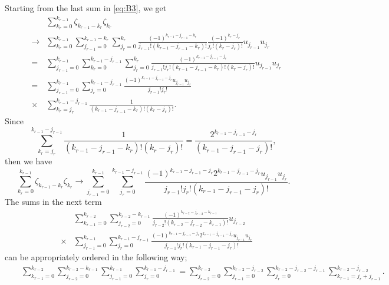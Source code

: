 \documentclass[10pt]{amsart}
\numberwithin{equation}{section}
\theoremstyle{definition}
\begin{document}
Starting from the last sum in  \eqref{eq:B3}, we get
\begin{eqnarray}
&&\sum _{k_{r}=0}^{k_{r-1}}\zeta _{k_{r-1}-k_{r}}\zeta _{k_{r}}
\label{eqC.5}
\\
&\to & \sum _{k_{r}=0}^{k_{r-1}}\sum _{j_{r-1}=0}^{k_{r-1}-k_{r}}
\sum _{j_{r}=0}^{k_{r}}
\frac{(-1)^{k_{r-1}-j_{r-1}-k_{r}}}{j_{r-1}!(k_{r-1}-j_{r-1}-k_{r})!}
\frac{(-1)^{k_{r}-j_{r }}}{j_{r}!(k_{r}-j_{r})!}u_{j_{r-1}}u_{j_{r}}
\nonumber
\\
&=& \sum _{j_{r-1}=0}^{k_{r-1}}\sum _{k_{r}=0}^{k_{r-1}-j_{r-1}}\sum _{j_{r}=0}^{k_{r}}
\frac{(-1)^{k_{r-1}-j_{r-1}-j_{r} }}{j_{r-1}!j_{r}!(k_{r-1}-j_{r-1}-k_{r})!(k_{r}-j_{r})!}
u_{j_{r-1}}u_{j_{r}}
\nonumber
\\
&=& \sum _{j_{r-1}=0}^{k_{r-1}}\sum _{j_{r}=0}^{k_{r-1}-j_{r-1}}
\frac{(-1)^{k_{r-1}-j_{r-1}-j_{r} }u_{j_{r-1}}u_{j_{r}}}{j_{r-1}!j_{r}!}
\nonumber
\\
&\times &\sum _{k_{r}=j_{r}}^{k_{r-1}-j_{r-1}}
\frac{1}{(k_{r-1}-j_{r-1}-k_{r})!(k_{r}-j_{r})!}.
\nonumber
\end{eqnarray}
Since
\begin{equation}
\sum _{k_{r}=j_{r}}^{k_{r-1}-j_{r-1}}
\frac{1}{(k_{r-1}-j_{r-1}-k_{r})!(k_{r}-j_{r})!}=
\frac{2^{k_{r-1}- j_{r-1}-j_{r}}}{( k_{r-1}-j_{r-1}-j_{r})!},
\label{eqC.6}
\end{equation}
then we have
\begin{equation}
\label{term1}
\sum _{k_{r}=0}^{k_{r-1}}\zeta _{k_{r-1}-k_{r}}\zeta _{k_{r}}\to
\sum _{j_{r-1}=0}^{k_{r-1}}\sum _{j_{r}=0}^{k_{r-1}-j_{r-1}}
\frac{(-1)^{k_{r-1}-j_{r-1}-j_{r} }2^{k_{r-1}- j_{r-1}-j_{r}}u_{j_{r-1}}u_{j_{r}}}{j_{r-1}!j_{r}!( k_{r-1}-j_{r-1}-j_{r})!}.
\end{equation}
The sums in the next term
\begin{eqnarray}
\label{eq:B8}
&&\sum _{k_{r-1}=0}^{k_{r-2}} \sum _{j_{r-2}=0}^{k_{r-2}-k_{r-1}}
\frac{(-1)^{k_{r-2}-j_{r-2}-k_{r-1}}}{j_{r-2}!(k_{r-2}-j_{r-2}-k_{r-1})!}u_{j_{r-2}}
\\
&\times & \sum _{j_{r-1}=0}^{k_{r-1}} \sum _{j_{r}=0}^{k_{r-1}-j_{r-1}}
\frac{(-1)^{k_{r-1}-j_{r-1}-j_{r} }2^{k_{r-1}- j_{r-1}-j_{r}}u_{j_{r-1}}u_{j_{r}}}{j_{r-1}!j_{r}!( k_{r-1}-j_{r-1}-j_{r})!}
\nonumber
\end{eqnarray}
can be appropriately ordered in the following way;
\begin{eqnarray}
&&\sum _{k_{r-1}=0}^{k_{r-2}} \sum _{j_{r-2}=0}^{k_{r-2}-k_{r-1}}
\sum _{j_{r-1}=0}^{k_{r-1}} \sum _{j_{r}=0}^{k_{r-1}-j_{r-1}} = \sum _{j_{r-2}=0}^{k_{r-2}}
\sum _{j_{r-1}=0}^{k_{r-2}-j_{r-2}} \sum _{j_{r}=0}^{k_{r-2}-j_{r-2}-j_{r-1}}
\sum _{k_{r-1}=j_{r}+j_{r-1}}^{k_{r-2}-j_{r-2}}.
\nonumber
\end{eqnarray}
\end{document}
